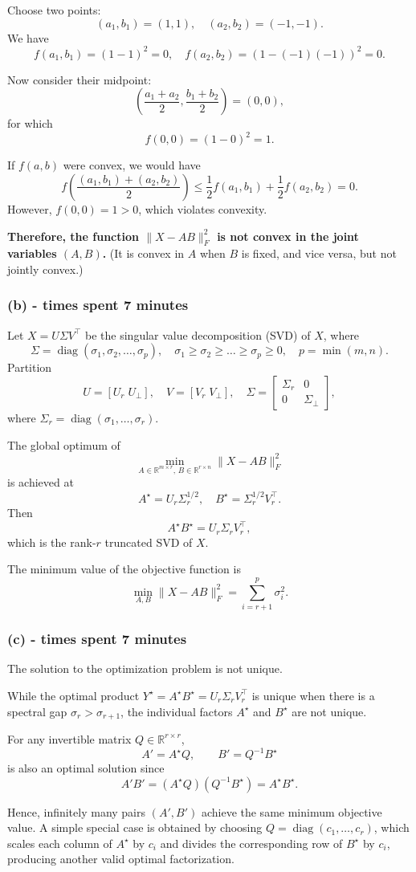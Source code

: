 \documentclass[11pt, reqno, letterpaper, twoside]{amsart}
\theoremstyle{plain}
\theoremstyle{definition}
\begin{document}
Choose two points:
\[
(a_1, b_1) = (1, 1), \quad (a_2, b_2) = (-1, -1).
\]
We have
\[
f(a_1, b_1) = (1 - 1)^2 = 0, \quad f(a_2, b_2) = (1 - (-1)(-1))^2 = 0.
\]

Now consider their midpoint:
\[
\left(\frac{a_1 + a_2}{2}, \frac{b_1 + b_2}{2}\right) = (0, 0),
\]
for which
\[
f(0, 0) = (1 - 0)^2 = 1.
\]

If \(f(a,b)\) were convex, we would have
\[
f\!\left(\frac{(a_1,b_1)+(a_2,b_2)}{2}\right)
\le \frac{1}{2}f(a_1,b_1) + \frac{1}{2}f(a_2,b_2) = 0.
\]
However, \( f(0,0) = 1 > 0 \), which violates convexity.

\smallskip

\textbf{Therefore, the function \( \|X - AB\|_F^2 \) is not convex in the joint variables \( (A,B) \).}  
(It is convex in \(A\) when \(B\) is fixed, and vice versa, but not jointly convex.)

\subsubsection*{(b) - times spent 7 minutes}
Let \( X = U \Sigma V^\top \) be the singular value decomposition (SVD) of \( X \), where
\[
\Sigma = \operatorname{diag}(\sigma_1, \sigma_2, \dots, \sigma_p), \quad \sigma_1 \ge \sigma_2 \ge \dots \ge \sigma_p \ge 0, \quad p = \min(m, n).
\]
Partition
\[
U = [U_r \; U_\perp], \quad V = [V_r \; V_\perp], \quad \Sigma = \begin{bmatrix} \Sigma_r & 0 \\ 0 & \Sigma_\perp \end{bmatrix},
\]
where \( \Sigma_r = \operatorname{diag}(\sigma_1, \dots, \sigma_r) \).

The global optimum of
\[
\min_{A \in \mathbb{R}^{m \times r},\, B \in \mathbb{R}^{r \times n}} \| X - AB \|_F^2
\]
is achieved at
\[
A^\star = U_r \Sigma_r^{1/2}, \quad B^\star = \Sigma_r^{1/2} V_r^\top.
\]
Then
\[
A^\star B^\star = U_r \Sigma_r V_r^\top,
\]
which is the rank-\(r\) truncated SVD of \(X\).

The minimum value of the objective function is
\[
\min_{A,B} \| X - AB \|_F^2 = \sum_{i = r+1}^{p} \sigma_i^2.
\]
\subsubsection*{(c) - times spent 7 minutes}
The solution to the optimization problem is not unique.

While the optimal product \( Y^\star = A^\star B^\star = U_r \Sigma_r V_r^\top \) is unique when there is a spectral gap 
\( \sigma_r > \sigma_{r+1} \), the individual factors \( A^\star \) and \( B^\star \) are not unique. 

For any invertible matrix \( Q \in \mathbb{R}^{r \times r} \),
\[
A' = A^\star Q, \qquad B' = Q^{-1} B^\star
\]
is also an optimal solution since
\[
A' B' = (A^\star Q)(Q^{-1} B^\star) = A^\star B^\star.
\]

Hence, infinitely many pairs \( (A', B') \) achieve the same minimum objective value.  
A simple special case is obtained by choosing \( Q = \operatorname{diag}(c_1, \dots, c_r) \),  
which scales each column of \( A^\star \) by \( c_i \) and divides the corresponding row of \( B^\star \) by \( c_i \),  
producing another valid optimal factorization.
\end{document}
